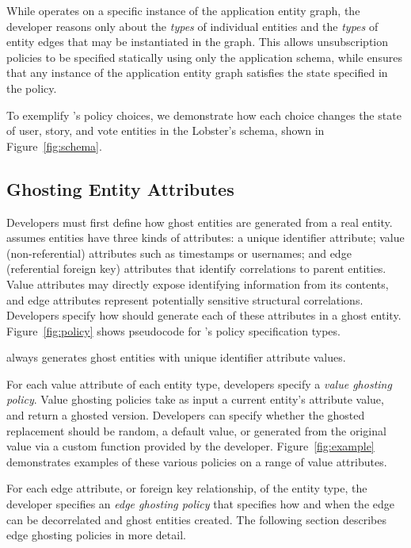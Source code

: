 While \sys operates on a specific instance of the application entity graph, the developer reasons
only about the \emph{types} of individual entities and the \emph{types} of entity edges that may be
instantiated in the graph. This allows unsubscription policies to be specified statically using only
the application schema, while \sys ensures that any instance of the application entity graph
satisfies the state specified in the policy.

To exemplify \sys's policy choices, we demonstrate how each choice changes the state of user, story,
and vote entities in the Lobster's schema, shown in Figure~\ref{fig:schema}.

\subsection{Ghosting Entity Attributes}
\label{sec:ghosting}
Developers must first define how ghost entities are generated from a real entity.
\sys assumes entities have three kinds of attributes: a unique identifier attribute; 
value (non-referential) attributes such as timestamps or usernames; and 
edge (referential foreign key) attributes that identify correlations to parent entities. 
Value attributes may directly expose identifying information from its
contents, and edge attributes represent potentially sensitive structural correlations. 
Developers specify how \sys should generate each of these attributes in a ghost entity.
Figure~\ref{fig:policy} shows pseudocode for \sys's policy specification types.

\sys always generates ghost entities with unique identifier attribute values.

For each value attribute of each entity type, developers specify a \emph{value ghosting policy}.
Value ghosting policies take as input a current entity's attribute value, and return a ghosted
version. Developers can specify whether the ghosted replacement should be random, a default value,
or generated from the original value via a custom function provided by the developer.
Figure~\ref{fig:example} demonstrates examples of these various policies on a range of
value attributes.

For each edge attribute, or foreign key relationship, of the entity type, the developer specifies an
\emph{edge ghosting policy} that specifies how and when the edge can be decorrelated and ghost
entities created.  The following section describes edge ghosting policies in more detail.



